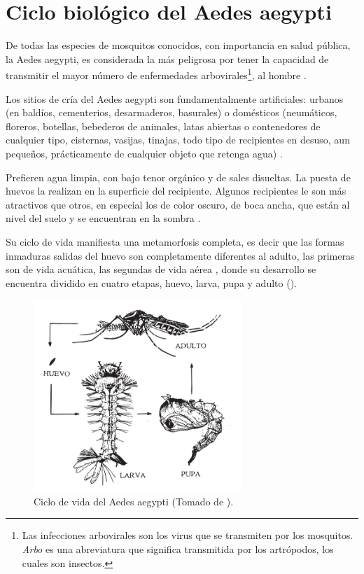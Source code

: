 
\section{Ciclo biológico del Aedes aegypti}
\label{sec:caracteristicas-biologicas}
De todas las especies de mosquitos conocidos, con importancia en salud pública, la Aedes aegypti,
es considerada la más peligrosa por tener la capacidad de transmitir el mayor número de enfermedades arbovirales\footnote{Las infecciones arbovirales son los virus que se transmiten por
los mosquitos. \textit{Arbo} es una abreviatura que significa transmitida por los artrópodos, los
cuales son insectos.}, al hombre \cite{ThironIzcazaJ2003}.

Los sitios de cría del Aedes aegypti son fundamentalmente artificiales: urbanos (en baldíos,
cementerios, desarmaderos, basurales) o domésticos (neumáticos, floreros, botellas, bebederos de
animales, latas abiertas o contenedores de cualquier tipo, cisternas, vasijas, tinajas, todo tipo
de recipientes en desuso, aun pequeños, prácticamente de cualquier objeto que retenga agua)
\cite{world2009dengue, directricesDetvArg}.

Prefieren agua limpia, con bajo tenor orgánico y de sales disueltas. La puesta de huevos la
realizan en la superficie del recipiente. Algunos recipientes le son más atractivos que otros, en
especial los de color oscuro, de boca ancha, que están al nivel del suelo y se encuentran en la
sombra \cite{ThironIzcazaJ2003}.

Su ciclo de vida manifiesta una metamorfosis completa, es decir que las formas inmaduras salidas
del huevo son completamente diferentes al adulto, las primeras son de vida acuática, las segundas
de vida aérea \cite{directricesDetvArg}, donde su desarrollo se encuentra dividido en cuatro
etapas, huevo, larva, pupa y adulto \cite{web-site:gMonteroBiologia}
().

\begin{figure}[!htbp]
\centering
\includegraphics[width=0.7\textwidth]{capitulo-3/graphics/ciclo-de-vida.png}
\caption{\label{fig:cap3-ciclo-de-vida} Ciclo de vida del Aedes aegypti (Tomado de
\cite{directricesDetvArg}).}
\end{figure}

